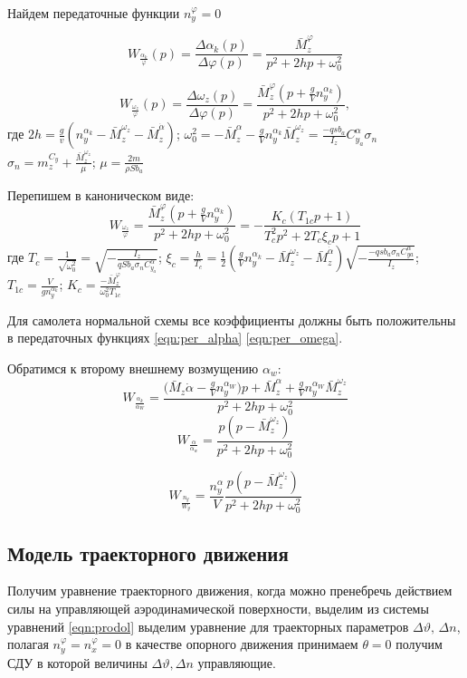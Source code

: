 \documentclass{article}
\begin{document}
Найдем передаточные функции $n_y^\varphi = 0$

\begin{equation}\label{eqn:per_alpha}
	W_{\frac{\alpha_k}{\varphi}}(p) = \frac{\Delta \alpha_k(p)}{\Delta
		\varphi(p)} = \frac{\bar{M}_z^\varphi}{p^2 + 2hp + \omega_0^2}
\end{equation}

\[
	W_{\frac{\omega_z}{\varphi}} (p) = \frac{\Delta \omega_z(p)}{\Delta
		\varphi(p)} =\frac{\bar{M}_z^\varphi(p + \frac{g}{V} n_y^{\alpha_k})}{p^2 +
		2hp + \omega_0^{2}},
\]
где $2h = \frac{g}{v}(n_y^{\alpha_k} - \bar{M}_z^{\omega_z} -
	\bar{M}_z^{\dot{\alpha}})$; $\omega_0^2 = - \bar{M}_z^{\alpha} - \frac{g}{V}
	n_y^{\alpha_k} \bar{M}_z^{\omega_z} = \frac{-qsb_a}{I_z} C_{y_a}^{\alpha}
	\sigma_{n}$\\
$\sigma_n = m_z^{C_y} + \frac{\bar{M}_z^{\omega_z}}{\mu}$; $\mu = \frac{2
		m}{\rho S b_a}$

Перепишем в каноническом виде:
\begin{equation}\label{eqn:per_omega}
	W_{\frac{\omega_z}{\varphi}} = \frac{\bar{M}_z^\varphi(p + \frac{g}{V}
		n_y^{\alpha_k})} {p^2 + 2hp + \omega_0^2}= %
	-\frac{K_c (T_{1c} p + 1)}{T^2_c p^2 + 2 T_c \xi_c p + 1}
\end{equation}
где $T_c = \frac{1}{\sqrt{\omega_0^2}} = \sqrt{-\frac{I_z}{q S b _a \sigma_n
			C_{y_a}^{\alpha}}}$; $\xi_c = \frac{h}{T_c} = \frac{1}{2}( \frac{g}{V}
	n_y^{\alpha_k} - \bar{M}_z^{\omega_z} - \bar{M}_z^{\dot{\alpha}})
	\sqrt{-\frac{-q s b_a \sigma_n C_{ya}^{\alpha}}{I_z}}$; $T_{1c} = \frac{V}{g
	n_y^{\alpha_k}}$; $K_c = \frac{-\bar{M}_z^\varphi}{\omega_0^2 T_{1c}}$

Для самолета нормальной схемы все коэффициенты должны быть положительны в
передаточных функциях \eqref{eqn:per_alpha} \eqref{eqn:per_omega}.

Обратимся к второму внешнему возмущению $\alpha_w$:
\[
	W_{\frac{\alpha_k}{\alpha_W}} = \frac{(\bar{M}_z {\dot{\alpha} -
	\frac{g}{V} n_y^{\alpha_W}) p + \bar{M}_z^\alpha + \frac{g}{V}
	n_y^{\alpha_W} \bar{M}_z^{\omega_z} }}{p^2 + 2hp + \omega_0^2}
\]
\[
	W_{\frac{\alpha}{\alpha_w}} = \frac{p(p - \bar{M}_z^{\omega_z})}{p^2 + 2hp+
	\omega_0^2}
\]

\[
	W_{\frac{n_y}{W_y}} = \frac{n_y^\alpha}{V} \frac{p(p -
	\bar{M}_z^{\omega_z})}{p^2 + 2hp + \omega_0^2}
\]
\newpage

\subsection{Модель траекторного движения}
Получим уравнение траекторного движения, когда можно пренебречь действием силы
на управляющей аэродинамической поверхности, выделим из системы уравнений
\eqref{eqn:prodol} выделим уравнение для траекторных параметров $\Delta
	\vartheta, \, \Delta n$, полагая $n_y^\varphi = n_x^\varphi = 0$ в качестве опорного
движения принимаем $\theta=0$ получим СДУ в которой величины $\Delta \vartheta,
	\Delta n$ управляющие.
\end{document}
